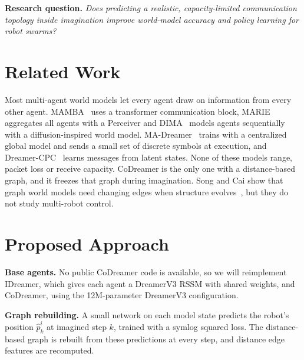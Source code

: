 \documentclass[conference]{IEEEtran}
\begin{document}
\textbf{Research question.} \emph{Does predicting a realistic, capacity-limited communication topology inside imagination improve world-model accuracy and policy learning for robot swarms?}

\section{Related Work}
Most multi-agent world models let every agent draw on information from every other agent. MAMBA~\cite{egorov2022mamba} uses a transformer communication block, MARIE~\cite{zhang2024marie} aggregates all agents with a Perceiver and DIMA~\cite{zhang2025dima} models agents sequentially with a diffusion-inspired world model. MA-Dreamer~\cite{lobos2022madreamer} trains with a centralized global model and sends a small set of discrete symbols at execution, and Dreamer-CPC~\cite{takayama2026dreamercpc} learns messages from latent states. None of these models range, packet loss or receive capacity. CoDreamer is the only one with a distance-based graph, and it freezes that graph during imagination. Song and Cai show that graph world models need changing edges when structure evolves~\cite{song2026gwm}, but they do not study multi-robot control.

\section{Proposed Approach}
\textbf{Base agents.} No public CoDreamer code is available, so we will reimplement IDreamer, which gives each agent a DreamerV3 RSSM with shared weights, and CoDreamer, using the 12M-parameter DreamerV3 configuration.

\textbf{Graph rebuilding.} A small network on each model state predicts the robot's position $\hat p_k^i$ at imagined step $k$, trained with a symlog squared loss. The distance-based graph is rebuilt from these predictions at every step, and distance edge features are recomputed.
\end{document}
